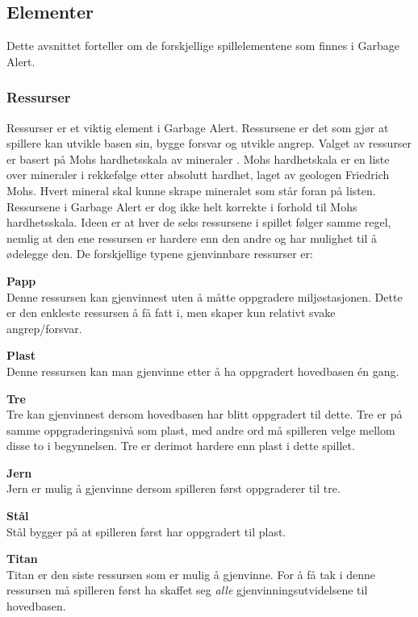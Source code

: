 




\subsection{Elementer} \label{sec:spillelement}
Dette avsnittet forteller om de forskjellige spillelementene som finnes
i Garbage Alert.

\subsubsection{Ressurser}
Ressurser er et viktig element i Garbage Alert. Ressursene er det som
gjør at spillere kan utvikle basen sin, bygge forsvar og utvikle angrep.
Valget av ressurser er basert på Mohs hardhetsskala av mineraler \cite{mohs}. Mohs hardhetskala er en liste over mineraler i rekkefølge etter absolutt hardhet, laget av geologen Friedrich Mohs. Hvert mineral skal kunne skrape mineralet som står foran på listen. Ressursene i Garbage Alert er dog ikke helt korrekte i forhold til Mohs hardhetsskala. Ideen er at hver de seks ressursene i spillet følger samme regel, nemlig at den ene ressursen er hardere enn den andre og har mulighet til å ødelegge den. 
De forskjellige typene gjenvinnbare ressurser er:

\begin{description}
	\item \textbf{Papp}\\ Denne ressursen kan gjenvinnest uten å måtte oppgradere miljøstasjonen. Dette er den enkleste ressursen å få fatt i, men skaper kun relativt svake angrep/forsvar.
	\item \textbf{Plast}\\ Denne ressursen kan man gjenvinne etter å ha oppgradert hovedbasen én gang.
	\item \textbf{Tre}\\ Tre kan gjenvinnest dersom hovedbasen har blitt oppgradert til dette. Tre er på samme oppgraderingsnivå som plast, med andre ord må spilleren velge mellom disse to i begynnelsen. Tre er derimot hardere enn plast i dette spillet.
	\item \textbf{Jern}\\ Jern er mulig å gjenvinne dersom spilleren først oppgraderer til tre.
	\item \textbf{Stål}\\ Stål bygger på at spilleren først har oppgradert til plast.
	\item \textbf{Titan}\\ Titan er den siste ressursen som er mulig å gjenvinne. For å få tak i denne ressursen må spilleren først ha skaffet seg \emph{alle} gjenvinningsutvidelsene til hovedbasen.
\end{description}


